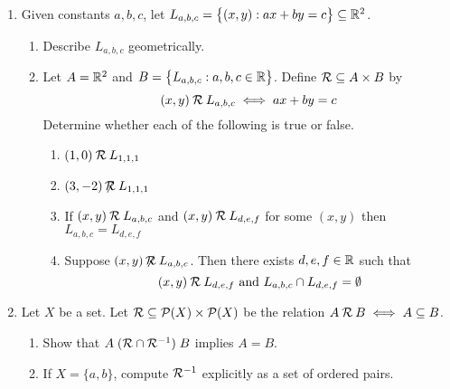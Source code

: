 \begin{enumerate}
	\item Given constants $a,b,c$, let $L_{a,b,c}= \bigl\{(x,y):ax+by=c\bigr\} \subseteq\mathbb{R}^2$. 
	\begin{enumerate}
    \item Describe $L_{a,b,c}$ geometrically.
    \item Let $A=\mathbb{R}^2$ and $B=\bigl\{L_{a,b,c}:a,b,c\in\mathbb{R}\bigr\}$. Define $\mathcal{R}\subseteq A\times B$ by
    \[
    	(x,y) \mathbin{\mathcal{R}} L_{a,b,c}\iff ax+by=c
    \]
    Determine whether each of the following is true or false.
    \begin{enumerate}
      \item $(1,0) \mathbin{\mathcal{R}} L_{1,1,1}$
      \item $(3,-2) \mathbin{\not\!\!\mathcal{R}} L_{1,1,1}$
      \item If $(x,y) \mathbin{\mathcal{R}} L_{a,b,c}$ and $(x,y) \mathbin{\mathcal{R}} L_{d,e,f}$ for some $(x,y)$ then $L_{a,b,c}=L_{d,e,f}$
      \item Suppose $(x,y)\mathbin{\not\!\!\mathcal{R}} L_{a,b,c}$. Then there exists $d,e,f\in\mathbb{R}$ such that
      \[
      	(x,y) \mathbin{\mathcal{R}} L_{d,e,f} \text{ and } L_{a,b,c} \cap L_{d,e,f}=\emptyset
      \]
    \end{enumerate}
	\end{enumerate}

	\item Let $X$ be a set. Let $\mathcal{R}\subseteq\mathcal{P}(X)\times\mathcal{P}(X)$ be the relation $A \mathbin{\mathcal{R}} B \iff A\subseteq B$.
	\begin{enumerate}
    \item Show that $A \mathrel{(\mathcal{R} \cap \mathcal{R}^{-1})} B$ implies $A=B$.
    \item If $X=\{a,b\}$, compute $\mathcal{R}^{-1}$ explicitly as a set of ordered pairs.
	\end{enumerate}
	
\end{enumerate}

